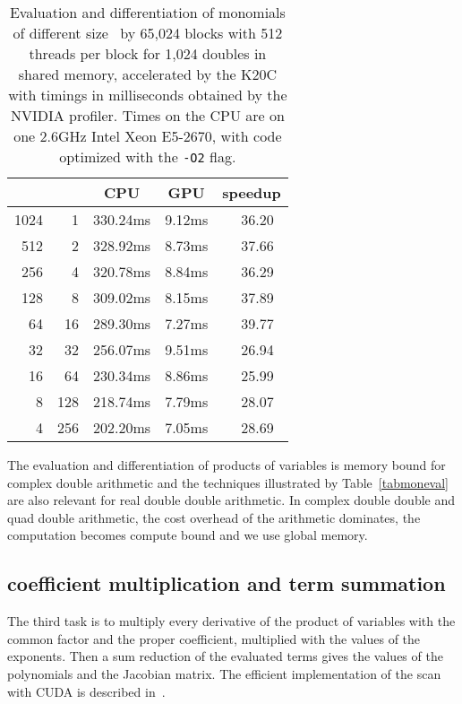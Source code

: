 \documentclass{article}
\begin{document}
\begin{table}[bh]
\begin{center}
\caption{Evaluation and differentiation of  monomials 
of different size~
by 65,024 blocks with 512 threads per block for 1,024 doubles in shared
memory, accelerated by the K20C with timings in milliseconds obtained by
the NVIDIA profiler. 
Times on the CPU are on one 2.6GHz Intel Xeon E5-2670,
with code optimized with the {\tt -O2} flag.}
\label{tabmoneval2}
\begin{tabular}{r| r| r r| r }
\multicolumn{1}{c|}{} & \multicolumn{1}{c|}{}
&  \multicolumn{1}{c}{CPU} & \multicolumn{1}{c|}{GPU}  & speedup \\ \hline
1024   &   1  & 330.24ms  & 9.12ms & 36.20~ \\
 512   &   2  & 328.92ms  & 8.73ms & 37.66~ \\
 256   &   4  & 320.78ms  & 8.84ms & 36.29~ \\ 
 128   &   8  & 309.02ms  & 8.15ms & 37.89~ \\
  64   &  16  & 289.30ms  & 7.27ms & 39.77~ \\
  32   &  32  & 256.07ms  & 9.51ms & 26.94~ \\
  16   &  64  & 230.34ms  & 8.86ms & 25.99~ \\ 
   8   & 128  & 218.74ms  & 7.79ms & 28.07~ \\ 
   4   & 256  & 202.20ms  & 7.05ms & 28.69~ \\
\end{tabular}
\end{center}
\end{table}

The evaluation and differentiation of products of variables
is memory bound for complex double arithmetic and the techniques illustrated
by Table~\ref{tabmoneval} are also relevant 
for real double double arithmetic.
In complex double double and quad double arithmetic, 
the cost overhead of the arithmetic
dominates, the computation becomes compute bound and we use global memory.

\subsection{coefficient multiplication and term summation}

The third task is to multiply every derivative of the product
of variables with the common factor and the proper coefficient,
multiplied with the values of the exponents.
Then a sum reduction of the evaluated terms gives the
values of the polynomials and the Jacobian matrix.
The efficient implementation of the scan with CUDA
is described in~\cite{Harris2}.
\end{document}

